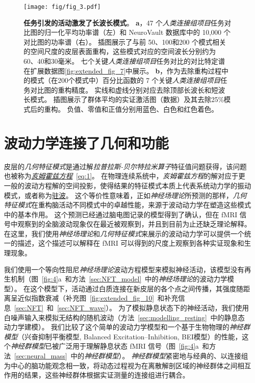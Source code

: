\documentclass[lang=cn,a4paper,newtx,citestyle=gb7714-2015, bibstyle=gb7714-2015]{elegantpaper}
\begin{document}
\begin{figure}[!htb]
	\centering
	\texttt{[image: fig/fig\_3.pdf]}
	\caption{\textbf{任务引发的活动激发了长波长模式}。
	\textbf{a}，47 个\textit{人类连接组项目}任务对比图的归一化平均功率谱（左）和 NeuroVault 数据库中的 10,000 个对比图的功率谱（右）。
	插图展示了与前 50、100和200 个模式相关的空间尺度的皮层表面重构，这些模式对应的空间波长分别约为 60、40和30毫米。
	七个关键\textit{人类连接组项目}任务对比的对比特定谱在扩展数据图\ref{fig:extended_fig_7}中展示。 
	\textbf{b}，作为去除重构过程中的模式（在200个模式中）百分比函数的 7 个关键\textit{人类连接组项目}任务对比图的重构精度。
	实线和虚线分别对应去除顶部长波长和短波长模式。
	插图展示了群体平均的实证激活图（数据）及其去除25\%模式后的重构。
	负值、零值和正值分别用蓝色、白色和红色着色。
	} \label{fig:3}
\end{figure}



\section{波动力学连接了几何和功能}

皮层的\textit{几何特征模式}是通过解\textit{拉普拉斯-贝尔特拉米算子}特征值问题获得，该问题也被称为\href{https://baike.baidu.com/item/%E4%BA%A5%E5%A7%86%E9%9C%8D%E5%85%B9%E6%96%B9%E7%A8%8B}{\textit{亥姆霍兹方程}}~\ref{eq:1}。
在物理连续系统中，\textit{亥姆霍兹方程}的解对应于更一般的波动方程解的空间投影，使得结果的特征模式本质上代表系统动力学的振动模式，或者称为\href{https://baike.baidu.com/item/%E9%A9%BB%E6%B3%A2}{驻波}。
这个等价性意味着，正如\textit{神经场理论}所预测的那样，\textit{几何特征模式}在重构脑活动不同模式中的卓越性能，来源于波动动力学在塑造这些模式中的基本作用。
这个预测已经通过脑电图记录的模型得到了确认，但在 fMRI 信号中观察到的全脑波动现象仅在最近被观察到，并且到目前为止还缺乏理论解释。
在这里，我们使用\textit{神经场理论}和\textit{几何特征模式}来展示的波动动力学可以提供一个统一的描述，这个描述可以解释在 fMRI 可以得到的尺度上观察到各种实证现象和生理现象。


我们使用一个等向性阻尼\textit{神经场理论}波动方程模型来模拟神经活动，该模型没有再生机制\cite{robinson1997propagation}（图~\ref{fig:4}a~和方法~\ref{sec:NFT_model}~中的\textit{神经场理论}的波动力学模型）。
在这个模型下，活动通过白质连接在新皮层的各个点之间传播，其强度随距离呈近似指数衰减（补充图~\ref{fig:extended_fig_10}~和补充信息~\ref{sec:NFT}~和~\ref{sec:NFT_wave}）。
为了模拟静息状态下的神经活动，我们使用白噪声输入来模拟无结构的随机波动（方法~\ref{sec:modelling_resting}~中的静息态动力学建模）。
我们比较了这个简单的波动力学模型和一个基于生物物理的\textit{神经群模型}（兴奋抑制平衡模型, Balanced Excitation–Inhibition, BEI模型）的性能，这个\textit{神经群模型}已被广泛用于理解静息状态 fMRI 信号\cite{deco2014local}（图~\ref{fig:4}a~和方法~\ref{sec:neural_mass}~中的\textit{神经群模型}）。
\textit{神经群模型}紧密地与经典的、以连接组为中心的脑功能观念相一致，将动态过程视为在离散解剖区域的神经群体之间相互作用的结果，这些神经群体根据实证测量的连接组进行耦合。
\end{document}

